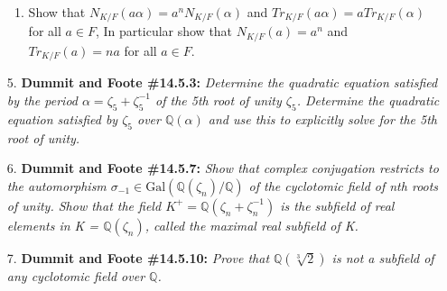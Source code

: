 \documentclass[12pt]{article}
\newcommand{\Q}{\mathbb{Q}}
\newcommand{\Gal}{\text{Gal}}
\begin{document}
\begin{enumerate}
\begin{enumerate}
    \item Show that $N_{K/F}(a\alpha) = a^n N_{K/F}(\alpha)$ and $Tr_{K/F}(a\alpha) = aTr_{K/F}(\alpha)$ for all $a\in F$, In particular show that $N_{K/F}(a) = a^n$ and $Tr_{K/F}(a) = na$ for all $a\in F$.

\end{enumerate}

\item[5.] \textbf{Dummit and Foote \#14.5.3:} \textit{Determine the quadratic equation satisfied by the period $\alpha = \zeta_5 + \zeta_5^{-1}$ of the 5th root of unity $\zeta_5$. Determine the quadratic equation satisfied by $\zeta_5$ over $\Q(\alpha)$ and use this to explicitly solve for the 5th root of unity.}

\item[6.] \textbf{Dummit and Foote \#14.5.7:} \textit{Show that complex conjugation restricts to the automorphism $\sigma_{-1}\in \Gal(\Q(\zeta_n)/\Q)$ of the cyclotomic field of nth roots of unity. Show that the field $K^+ = \Q(\zeta_n + \zeta_n^{-1})$ is the
subfield of real elements in K = $\Q(\zeta_n)$, called the maximal real subfield of K.}

\item[7.] \textbf{Dummit and Foote \#14.5.10:} \textit{Prove that $\Q(\sqrt[3]{2})$ is not a subfield of any cyclotomic field over $\Q$.}

\end{enumerate}
\end{document}
